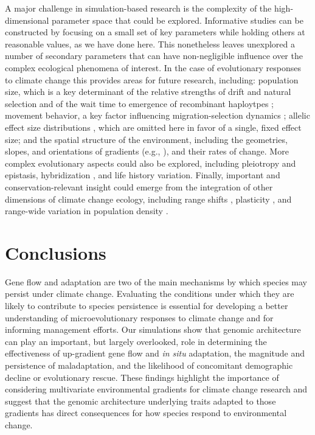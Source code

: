 \documentclass[9pt,twocolumn,twoside,lineno]{new_article}
\begin{document}
A major challenge in simulation-based research is the complexity of the high-dimensional 
parameter space that could be explored.
Informative studies can be constructed by focusing on a small set of
key parameters while holding others at reasonable values, as we have done here.
This nonetheless leaves unexplored a number of secondary parameters
that can have non-negligible influence over the complex ecological phenomena of interest.
In the case of evolutionary responses to climate change
this provides areas for future research, including:
population size, which is a key determinant of the relative strengths of drift
and natural selection \cite{murray} and of the wait time to emergence of
recombinant haploytpes \cite{christiansen};
movement behavior, a key factor influencing
migration-selection dynamics \cite{wright,haldane,barton};
allelic effect size distributions \cite{orr},
which are omitted here in favor of a single, fixed effect size;
and the spatial structure of the environment,
including the geometries, slopes, and orientations of gradients
(e.g., \cite{benes}), and their rates of change.
More complex evolutionary aspects could also be explored, including 
pleiotropy \cite{thompson} and epistasis,
hybridization \cite{turbek}, and life history variation.
Finally, important and conservation-relevant insight could emerge from the 
integration of other dimensions of climate change ecology, including range shifts 
\cite{weiss-lehman}, plasticity \cite{chevin},
and range-wide variation in population density \cite{aitken_whitlock}.

\section*{Conclusions}
Gene flow and adaptation are two of the main mechanisms by which species may persist under climate change. Evaluating the conditions under which they are likely to contribute to species persistence is essential for developing a better understanding 
of microevolutionary responses to climate change and for informing management efforts. Our simulations show that 
genomic architecture can play an important, but largely overlooked, role in determining the effectiveness
of up-gradient gene flow and \textit{in situ} adaptation,
the magnitude and persistence
of maladaptation,
and the likelihood of concomitant demographic decline
or evolutionary rescue. These findings highlight the importance of considering multivariate environmental gradients for climate change research and suggest that the genomic architecture underlying traits adapted to those gradients has direct consequences for how species respond to environmental change.
\end{document}
